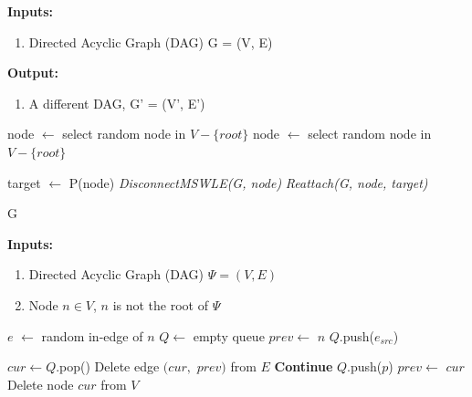 \documentclass{article}
\begin{document}
\begin{algorithm}[H]
\caption{Sub-Network Redirect and Preserve Ploidy}\label{euclid}

\textbf{Inputs:} 
\begin{enumerate}
    \item Directed Acyclic Graph (DAG) G = (V, E)
    
\end{enumerate}
\textbf{Output:}
\begin{enumerate}
    \item A different DAG, G' = (V', E')
\end{enumerate}

  \begin{algorithmic}[1]
    
        \State node $\gets$ select random node in \(V - \{root\}\)
            \State node $\gets$ select random node in \(V - \{root\}\) 
        \EndWhile

        \State target $\gets$ P(node)
        \State \textit{DisconnectMSWLE(G, node)}
        \State \textit{Reattach(G, node, target)}

        \Return G
        
    \EndProcedure
  \end{algorithmic}


\end{algorithm}


\begin{algorithm}[H]
\caption{DisconnectMSWLE}\label{euclid}

\textbf{Inputs:} 
\begin{enumerate}
    \item Directed Acyclic Graph (DAG) $\Psi = (V, E)$
    \item Node $n \in V$, $n$ is not the root of $\Psi$
\end{enumerate}

  \begin{algorithmic}[1]
        \State $e$ $\gets$ random in-edge of $n$
        \State $Q \gets$ empty queue
        \State $prev \gets$ $n$
        \State $Q$.push($e_{src}$) 
        
            \State $cur \gets Q$.pop()
            \State Delete edge $(cur,$ $prev)$ from $E$
             
                \State \textbf{Continue}
            \EndIf
                \State $Q$.push($p$)
            \EndFor
            \State $prev \gets$ $cur$
            \State Delete node $cur$ from $V$
        \EndWhile
    \State 
    \EndProcedure
  \end{algorithmic}


\end{algorithm}
\end{document}
